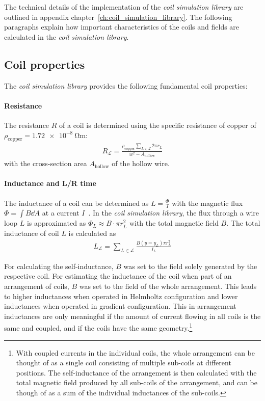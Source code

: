 The technical details of the implementation of the \textit{coil simulation library} are outlined in appendix chapter~\ref{ch:coil_simulation_library}. The following paragraphs explain how important characteristics of the coils and fields are calculated in the \textit{coil simulation library}.

\subsection*{Coil properties}
The \textit{coil simulation library} provides the following fundamental coil properties:
\paragraph{Resistance}
The resistance $R$ of a coil is determined using the specific resistance of copper of $\rho_\text{copper} = \SI{1.72e-8}{\ohm\meter}$:
\begin{align}\label{eq:resistance_simulation}
    R_\mathcal{L} = \frac{\rho_\text{copper} \sum\limits_{L \in \mathcal{L}} 2\pi r_L} {w^2 - A_\text{hollow}}
\end{align}
with the cross-section area $A_\text{hollow}$ of the hollow wire.

\paragraph{Inductance and L/R time} The inductance of a coil can be determined as $L = \frac{\Phi}{I}$ with the magnetic flux $\Phi = \int B \dd A$ at a current $I$~\cite{demtroder_zeitlich_2013}. In the \textit{coil simulation library}, the flux through a wire loop $L$ is approximated as $\Phi_L \approx B \cdot \pi r_L^2$ with the total magnetic field $B$. The total inductance of coil $L$ is calculated as
\begin{align}\label{eq:inductance_simulation}
    L_\mathcal{L} = \sum\limits_{L \in \mathcal{L}} \frac{B(y = y_L) \pi r_L^2}{I_L}
\end{align}

For calculating the self-inductance, $B$ was set to the field solely generated by the respective coil. For estimating the inductance of the coil when part of an arrangement of coils, $B$ was set to the field of the whole arrangement. This leads to higher inductances when operated in Helmholtz configuration and lower inductances when operated in gradient configuration. This in-arrangement inductances are only meaningful if the amount of current flowing in all coils is the same and coupled, and if the coils have the same geometry.\footnote{With coupled currents in the individual coils, the whole arrangement can be thought of as a single coil consisting of multiple sub-coils at different positions. The self-inductance of the arrangement is then calculated with the total magnetic field produced by all sub-coils of the arrangement, and can be though of as a sum of the individual inductances of the sub-coils.}

